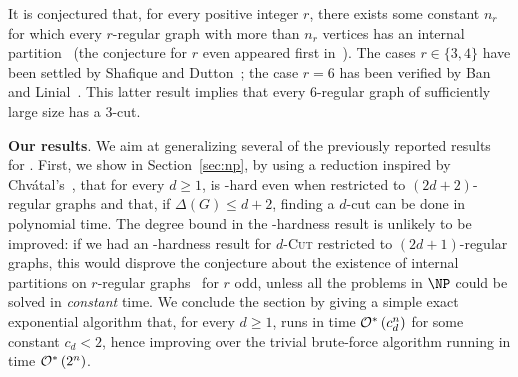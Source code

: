It is conjectured that, for every positive integer $r$, there exists some constant $n_r$ for which every $r$-regular graph with more than $n_r$ vertices has an internal partition~\cite{DeVos09,internal_partition_regular6} (the conjecture for $r$ even appeared first in~\cite{internal_partition_regular3_4}).
The cases $r \in \{3,4\}$ have been settled by Shafique and Dutton~\cite{internal_partition_regular3_4}; the case $r=6$ has been verified by Ban and Linial~\cite{internal_partition_regular6}.
This latter result implies that every 6-regular graph of sufficiently large size has a 3-cut.

\medskip 

\noindent \textbf{Our results}. We aim at generalizing several of the previously reported results  for .
First, we show in Section~\ref{sec:np}, by using a reduction inspired by Chvátal's~\cite{chvatal_matching_cut}, that for every $d \geq 1$,  is \NP-hard even when restricted to $(2d+2)$-regular graphs and that, if $\Delta(G) \leq d+2$, finding a $d$-cut can be done in polynomial time. The degree bound in the \NP-hardness result is unlikely to be improved: if we had an \NP-hardness result for \textsc{$d$-Cut} restricted to $(2d+1)$-regular graphs, this would disprove the conjecture about the existence of internal partitions on $r$-regular graphs~\cite{DeVos09,internal_partition_regular6,internal_partition_regular3_4} for $r$ odd, unless all the problems in $\NP$ could be solved in \textit{constant} time. We conclude the section by giving a simple exact exponential algorithm that,  for every $d \geq 1$, runs in time $\mathcal{O}^*\left(c_d^n\right)$ for some constant $c_d < 2$, hence improving over the trivial brute-force algorithm running in time $\mathcal{O}^*\left(2^n\right)$.

